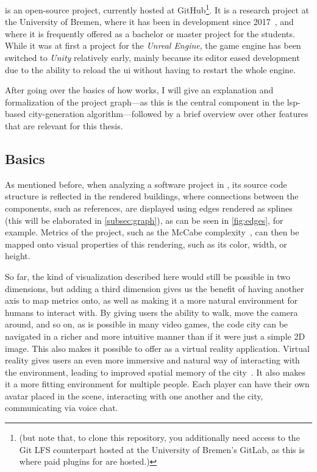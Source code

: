 \documentclass[../thesis]{subfiles}
\begin{document}
\SEE{} is an open-source project, currently hosted at GitHub\footnote{ (but note that, to clone this repository, you additionally need access to the Git LFS counterpart hosted at the University of Bremen's GitLab, as this is where paid plugins for \SEE{} are hosted.)}.
It is a research project at the University of Bremen, where it has been in development since 2017~\cite{ganser2017}, and where it is frequently offered as a bachelor or master project for the students.
While it was at first a project for the \emph{Unreal Engine}, the game engine has been switched to \emph{Unity} relatively early, mainly because its editor eased development due to the ability to reload the \gls*{ui} without having to restart the whole engine.

After going over the basics of how \SEE{} works, I will give an explanation and formalization of the project graph---as this is the central component in the \gls{lsp}-based \gls{city}-generation algorithm---followed by a brief overview over other features that are relevant for this thesis.

\subsection{Basics}
As mentioned before, when analyzing a software project in \SEE{}, its source code structure is reflected in the rendered buildings, where connections between the components, such as references, are displayed using edges rendered as splines (this will be elaborated in \cref{subsec:graph}), as can be seen in \cref{fig:edges}, for example.
Metrics of the project, such as the McCabe complexity~\cite{mccabe}, can then be mapped onto visual properties of this rendering, such as its color, width, or height.

So far, the kind of visualization described here would still be possible in two dimensions, but adding a third dimension gives us the benefit of having another axis to map metrics onto, as well as making it a more natural environment for humans to interact with.
By giving users the ability to walk, move the camera around, and so on, as is possible in many video games, the code city can be navigated in a richer and more intuitive manner than if it were just a simple 2D image.
This also makes it possible to offer \SEE{} as a virtual reality application.
Virtual reality gives users an even more immersive and natural way of interacting with the environment, leading to improved spatial memory of the city~\cite[\eg,][]{tavanti2001}.
It also makes it a more fitting environment for multiple people.
Each player can have their own avatar placed in the scene, interacting with one another and the city, communicating via voice chat.
\end{document}
